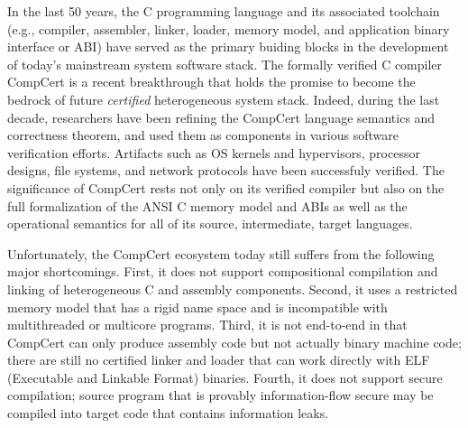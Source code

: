 \documentclass[11pt]{article}
\begin{document}
In the last 50 years, the C programming language and its associated
toolchain (e.g., compiler, assembler, linker, loader, memory model,
and application binary interface or ABI) have served as the primary
buiding blocks in the development of today's mainstream system
software stack. The formally verified C compiler CompCert is a recent
breakthrough that holds the promise to become the bedrock of future
{\em certified} heterogeneous system stack.  Indeed, during the last
decade, researchers have been refining the CompCert language semantics
and correctness theorem, and used them as components in various
software verification efforts. Artifacts such as OS kernels and
hypervisors, processor designs, file systems, and network protocols
have been successfuly verified. The significance of CompCert rests not
only on its verified compiler but also on the full formalization of
the ANSI C memory model and ABIs as well as the operational semantics
for all of its source, intermediate, target languages.

Unfortunately, the CompCert ecosystem today still suffers from the
following major shortcomings. First, it does not support compositional
compilation and linking of heterogeneous C and assembly components.
Second, it uses a restricted memory model that has a rigid name space
and is incompatible with multithreaded or multicore programs.  Third,
it is not end-to-end in that CompCert can only produce assembly code
but not actually binary machine code; there are still no certified
linker and loader that can work directly with ELF (Executable and
Linkable Format) binaries.  Fourth, it does not support secure
compilation; source program that is provably information-flow secure
may be compiled into target code that contains information leaks.
\end{document}
